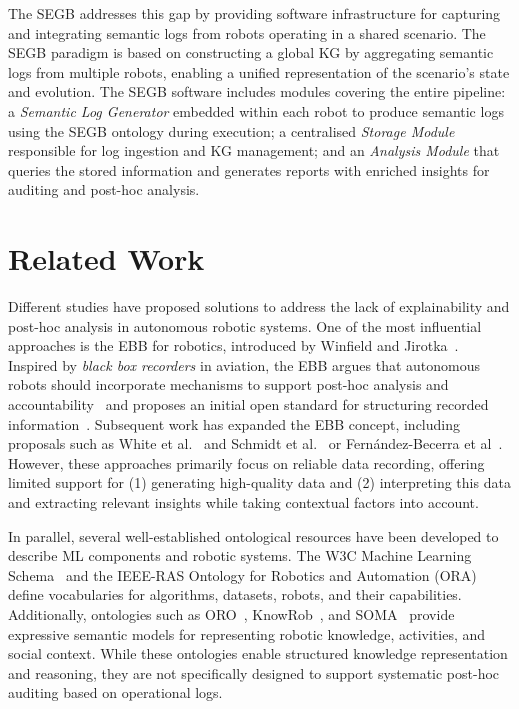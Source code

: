 \documentclass[preprint,12pt, a4paper]{elsarticle}
\begin{document}
The \ac{SEGB} addresses this gap by providing software infrastructure for capturing and integrating semantic logs from robots operating in a shared scenario. The SEGB paradigm is based on constructing a global \ac{KG} by aggregating semantic logs from multiple robots, enabling a unified representation of the scenario’s state and evolution. The SEGB software includes modules covering the entire pipeline: a \textit{Semantic Log Generator} embedded within each robot to produce semantic logs using the \ac{SEGB} ontology during execution; a centralised \textit{Storage Module} responsible for log ingestion and \ac{KG} management; and an \textit{Analysis Module} that queries the stored information and generates reports with enriched insights for auditing and post-hoc analysis.


\section{Related Work}

Different studies have proposed solutions to address the lack of explainability and post-hoc analysis in autonomous robotic systems. One of the most influential approaches is the \ac{EBB} for robotics, introduced by Winfield and Jirotka~\cite{Towards_Autonomous_Robotic_Systems}. Inspired by \textit{black box recorders} in aviation, the \ac{EBB} argues that autonomous robots should incorporate mechanisms to support post-hoc analysis and accountability~\cite{Winfield2022} and proposes an initial open standard for structuring recorded information~\cite{winkle2020could}. Subsequent work has expanded the \ac{EBB} concept, including proposals such as White et al.~\cite{white2019black} and Schmidt et al.~\cite{schmidt2022modular} or Fernández-Becerra et al~\cite{fernandez2024enhancing}. However, these approaches primarily focus on reliable data recording, offering limited support for (1) generating high-quality data and (2) interpreting this data and extracting relevant insights while taking contextual factors into account.

In parallel, several well-established ontological resources have been developed to describe \ac{ML} components and robotic systems. The W3C Machine Learning Schema~\cite{publio2020ml} and the IEEE-RAS Ontology for Robotics and Automation (ORA)~\cite{schlenoff2012ieee} define vocabularies for algorithms, datasets, robots, and their capabilities. Additionally, ontologies such as ORO~\cite{olszewska2017ontology}, KnowRob~\cite{beetz2018know}, and SOMA~\cite{bessler2021foundations} provide expressive semantic models for representing robotic knowledge, activities, and social context. While these ontologies enable structured knowledge representation and reasoning, they are not specifically designed to support systematic post-hoc auditing based on operational logs.
\end{document}
